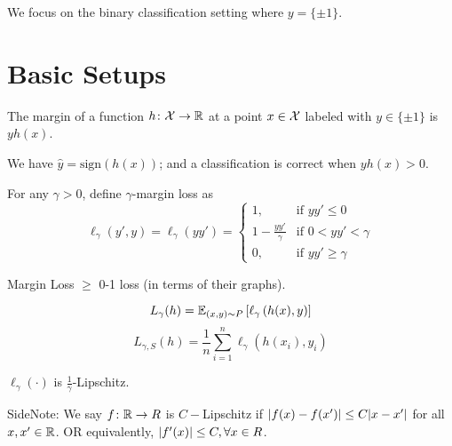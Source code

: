We focus on the binary classification setting where \(y = \{\pm 1\}\). 

\section{Basic Setups}

\begin{definition}[Margin]\label{def:margin}
    The margin of a function \(h \colon \mathcal{X} \to \mathbb{R}\) at a point \(x \in \mathcal{X}\) labeled 
    with \(y \in \{\pm 1\}\) is \(yh(x)\). 
\end{definition}

\begin{remark}
    We have \( \hat{y} = \text{sign}\left(h(x)\right)\); and a classification is correct when 
    \(y h(x) > 0\). 
\end{remark}

\begin{definition}\label{def:margin_loss}
    For any \(\gamma > 0\), define \(\gamma\)-margin loss as 
    \[
        \ell_\gamma (y', y) = \ell_\gamma(yy') = \begin{cases}
            1, &\text{if } yy' \leq 0 \\ 
            1 - \frac{yy'}{\gamma} &\text{if } 0 < yy' < \gamma \\ 
            0, &\text{if } yy' \geq \gamma 
        \end{cases}  
    \]
\end{definition}

\begin{remark}
    Margin Loss \(\geq\) 0-1 loss (in terms of their graphs). 
\end{remark}

\begin{definition}
    \[
        L_\gamma (h) = \mathbb{E}_{(x,y) \sim P} \left[ \ell_\gamma \left(h(x), y\right) \right] 
    \] 
    \[ 
        L_{\gamma, S} (h) = \frac{1}{n} \sum_{i=1}^n \ell_\gamma \left(h(x_i), y_i\right)  
    \]
\end{definition}

\begin{remark}
    \(\ell_\gamma (\cdot)\) is \(\frac{1}{\gamma}\)-Lipschitz. 
\end{remark}

SideNote: We say \(f \colon \mathbb{R} \to R\) is \(C-\)Lipschitz if \(\lvert f(x) - f(x') \rvert
\leq C\lvert x - x' \rvert\) for all \(x, x' \in \mathbb{R}\). OR equivalently, \(\lvert f'(x) \rvert \leq C,
\forall x \in R\). 

